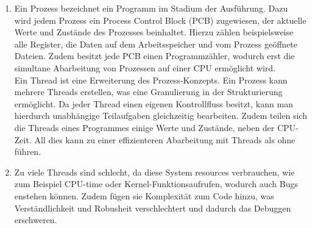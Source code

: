 \documentclass[11pt]{article}
\begin{document}
\begin{enumerate}[label=\alph*)]
\item Ein Prozess bezeichnet ein Programm im Stadium der Ausführung. Dazu wird jedem Prozess ein Process Control Block (PCB) zugewiesen, der aktuelle Werte und Zustände des Prozesses beinhaltet. Hierzu zählen beispielsweise alle Register, die Daten auf dem Arbeitsspeicher und vom Prozess geöffnete Dateien. Zudem besitzt jede PCB einen Programmzähler, wodurch erst die simultane Abarbeitung von Prozessen auf einer CPU ermöglicht wird.\\
Ein Thread ist eine Erweiterung des Prozess-Konzepts. Ein Prozess kann mehrere Threads erstellen, was eine Granulierung in der Strukturierung ermöglicht. Da jeder Thread einen eigenen Kontrollfluss besitzt, kann man hierdurch unabhängige Teilaufgaben gleichzeitig bearbeiten. Zudem teilen sich die Threads eines Programmes einige Werte und Zustände, neben der CPU-Zeit. All dies kann zu einer effizienteren Abarbeitung mit Threads als ohne führen.

\item Zu viele Threads sind schlecht, da diese System resources verbrauchen, wie zum Beispiel CPU-time oder Kernel-Funktionsaufrufen, wodurch auch Bugs enstehen können. Zudem fügen sie Komplexität zum Code hinzu, was Verständlichkeit und Robusheit verschlechtert und dadurch das Debuggen erschweren.
\end{enumerate}
\end{document}
